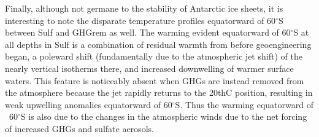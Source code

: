 \documentclass{nature}
\begin{document}
Finally, although not germane to the stability of Antarctic ice sheets, it is interesting to note the disparate temperature profiles equatorward of 60$^\circ$S between Sulf and GHGrem as well. The warming evident equatorward of 60$^\circ$S at all depths in Sulf is a combination of residual warmth from before geoengineering began, a poleward shift (fundamentally due to the atmospheric jet shift) of the nearly vertical isotherms there, and increased downwelling of warmer surface waters. This feature is noticeably absent when GHGs are instead removed from the atmosphere because the jet rapidly returns to the 20thC position, resulting in weak upwelling anomalies equatorward of 60$^\circ$S. Thus the warming equatorward of ~60$^\circ$S is also due to the changes in the atmospheric winds due to the net forcing of increased GHGs and sulfate aerosols. %
\end{document}

